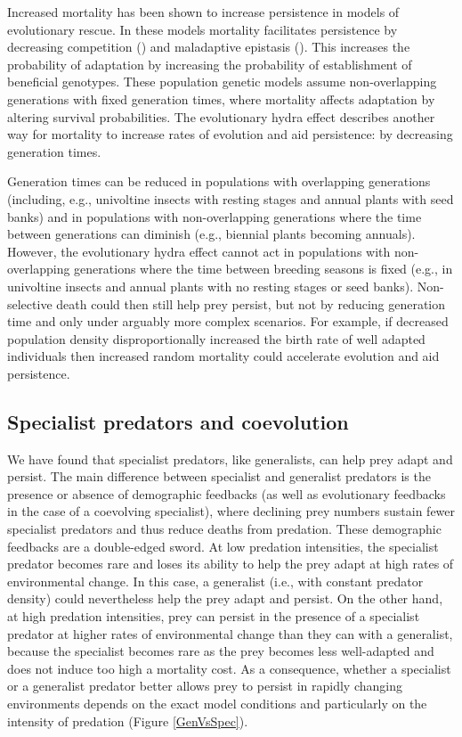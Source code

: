 \documentclass[11pt]{article}
\begin{document}
Increased mortality has been shown to increase persistence in models of evolutionary rescue. 
In these models mortality facilitates persistence by decreasing competition (\citealt{Uecker2014}) and maladaptive epistasis (\citealt{Uecker2016}).
This increases the probability of adaptation by increasing the probability of establishment of beneficial genotypes.
These population genetic models assume non-overlapping generations with fixed generation times, where mortality affects adaptation by altering survival probabilities.
The evolutionary hydra effect describes another way for mortality to increase rates of evolution and aid persistence: by decreasing generation times.

Generation times can be reduced in populations with overlapping generations (including, e.g., univoltine insects with resting stages and annual plants with seed banks) and in populations with non-overlapping generations where the time between generations can diminish (e.g., biennial plants becoming annuals).
However, the evolutionary hydra effect cannot act in populations with non-overlapping generations where the time between breeding seasons is fixed (e.g., in univoltine insects and annual plants with no resting stages or seed banks). 
Non-selective death could then still help prey persist, but not by reducing generation time and only under arguably more complex scenarios.
For example, if decreased population density disproportionally increased the birth rate of well adapted individuals then increased random mortality could accelerate evolution and aid persistence.

\subsection*{Specialist predators and coevolution}

We have found that specialist predators, like generalists, can help prey adapt and persist.
The main difference between specialist and generalist predators is the presence or absence of demographic feedbacks (as well as evolutionary feedbacks in the case of a coevolving specialist), where declining prey numbers sustain fewer specialist predators and thus reduce deaths from predation.
These demographic feedbacks are a double-edged sword.
At low predation intensities, the specialist predator becomes rare and loses its ability to help the prey adapt at high rates of environmental change.
In this case, a generalist (i.e., with constant predator density) could nevertheless help the prey adapt and persist.
On the other hand, at high predation intensities, prey can persist in the presence of a specialist predator at higher rates of environmental change than they can with a generalist, because the specialist becomes rare as the prey becomes less well-adapted and does not induce too high a mortality cost.
As a consequence, whether a specialist or a generalist predator better allows prey to persist in rapidly changing environments depends on the exact model conditions and particularly on the intensity of predation (Figure  \ref{GenVsSpec}).
\end{document}
